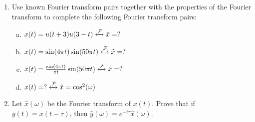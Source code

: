 \begin{enumerate}
\item Use known Fourier transform pairs together with the properties of the Fourier transform to complete the following Fourier transform pairs:
  \begin{enumerate}[a)]
  \item $x(t) = u(t+3)u(3-t) \xleftrightarrow{\mathcal{F}} \hat{x} = ?$
  \item $x(t) = \sin(4\pi t) \sin(50 \pi t)  \xleftrightarrow{\mathcal{F}} \hat{x} = ?$
  \item $x(t) = \frac{\sin(4\pi t)}{\pi t} \sin(50 \pi t)  \xleftrightarrow{\mathcal{F}} \hat{x} = ?$
  \item $x(t) = ?  \xleftrightarrow{\mathcal{F}} \hat{x} = \cos^2(\omega)$    
  \end{enumerate}


\item Let $\hat{x}(\omega)$ be the Fourier transform of $x(t)$. Prove that if $y(t)=x(t-\tau)$, then $\hat{y}(\omega)=e^{-i\tau}\hat{x}(\omega)$. 
  
  
  
  
\end{enumerate}
